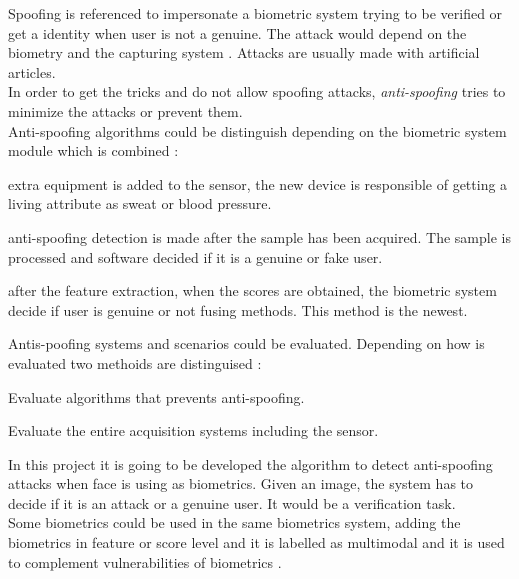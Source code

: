 Spoofing is referenced to impersonate a biometric system trying to be verified or get a identity when user is not a genuine. The attack would depend on the biometry and the capturing system \cite{Spoofing_survey}. Attacks are usually made with artificial articles.\\

In order to get the tricks and do not allow spoofing attacks, \textit{anti-spoofing} tries to minimize the attacks or prevent them.\\

Anti-spoofing algorithms could be distinguish depending on the biometric system module which is combined \cite{Spoofing_survey}:
\begin{description}[noitemsep,topsep=8pt,parsep=0pt,partopsep=20pt]
\item[Sensor level:] extra equipment is added to the sensor, the new device is responsible of getting a living attribute as sweat or blood pressure. 
\item[Feature level:] anti-spoofing detection is made after the sample has been acquired. The sample is processed and software decided if it is a genuine or fake user.
\item[Score level:] after the feature extraction, when the scores are obtained, the biometric system decide if user is genuine or not fusing methods. This method is the newest.
\end{description}


Antis-poofing systems and scenarios could be evaluated. Depending on how is evaluated two methoids are distinguised \cite{Spoofing_survey}:
\begin{description}[noitemsep,topsep=8pt,parsep=0pt,partopsep=20pt]
\item[Algorithm-based or technology evaluation:] Evaluate algorithms that prevents anti-spoofing.
\item[System-based or scenario evaluation:] Evaluate the entire acquisition systems including the sensor.
\end{description}

In this project it is going to be developed the algorithm to detect anti-spoofing attacks when face is using as biometrics. Given an image, the system has to decide if it is an attack or a genuine user. It would be a verification task.\\

Some biometrics could be used in the same biometrics system, adding the biometrics in feature or score level and it is labelled as multimodal and it is used to complement vulnerabilities of biometrics \cite{Spoofing_survey}.

